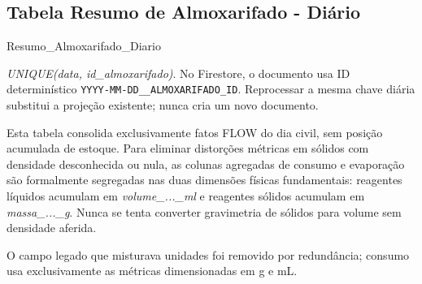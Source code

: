 \subsection{Tabela Resumo de Almoxarifado - Diário}
\begin{entidade}{Resumo\_Almoxarifado\_Diario}
\end{entidade}
\begin{regra}
\textit{UNIQUE(data, id\_almoxarifado)}. No Firestore, o documento usa ID determinístico \texttt{YYYY-MM-DD\_\_ALMOXARIFADO\_ID}. Reprocessar a mesma chave diária substitui a projeção existente; nunca cria um novo documento.
\end{regra}
\newpage
\begin{explicacao}
Esta tabela consolida exclusivamente fatos FLOW do dia civil, sem posição acumulada de estoque.
Para eliminar distorções métricas em sólidos com densidade desconhecida ou nula, as colunas agregadas de consumo e evaporação são formalmente segregadas nas duas dimensões físicas fundamentais: reagentes líquidos acumulam em \textit{volume\_...\_ml} e reagentes sólidos acumulam em \textit{massa\_...\_g}. Nunca se tenta converter gravimetria de sólidos para volume sem densidade aferida.

O campo legado que misturava unidades foi removido por redundância; consumo usa exclusivamente as métricas dimensionadas em g e mL.
\end{explicacao}

